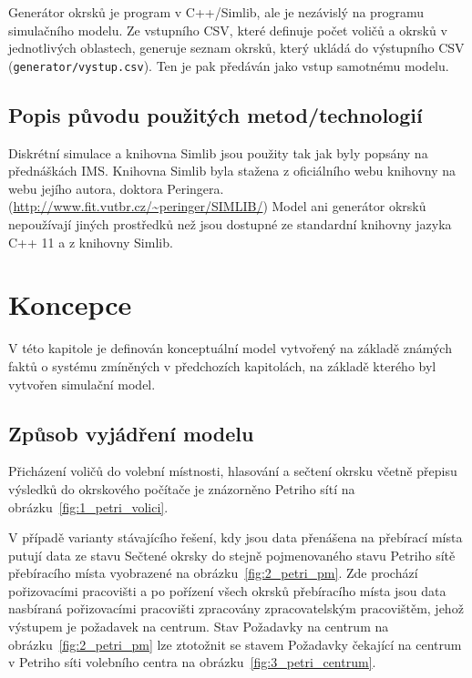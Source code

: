 \documentclass[12pt,a4paper,titlepage,final]{article}
\begin{document}
Generátor okrsků je program v C++/Simlib, ale je nezávislý na programu simulačního modelu. Ze vstupního CSV, které definuje počet voličů a okrsků v jednotlivých oblastech, generuje seznam okrsků, který ukládá do výstupního CSV (\texttt{generator/vystup.csv}). Ten je pak předáván jako vstup samotnému modelu.

\subsection{Popis původu použitých metod/technologií}

Diskrétní simulace a knihovna Simlib jsou použity tak jak byly popsány na přednáškách IMS. Knihovna Simlib byla stažena z oficiálního webu knihovny na webu jejího autora, doktora Peringera. (\url{http://www.fit.vutbr.cz/~peringer/SIMLIB/}) Model ani generátor okrsků nepoužívají jiných prostředků než jsou dostupné ze standardní knihovny jazyka C++ 11 a z knihovny Simlib.

\section{Koncepce} \label{koncepce}

V této kapitole je definován konceptuální model \cite[str. 48]{ims} vytvořený na základě známých faktů o systému zmíněných v předchozích kapitolách, na základě kterého byl vytvořen simulační model.

\subsection{Způsob vyjádření modelu}

Přicházení voličů do volební místnosti, hlasování a sečtení okrsku včetně přepisu výsledků do okrskového počítače je znázorněno Petriho sítí na obrázku~\ref{fig:1_petri_volici}.

V případě varianty stávajícího řešení, kdy jsou data přenášena na přebírací místa putují data ze stavu Sečtené okrsky do stejně pojmenovaného stavu Petriho sítě přebíracího místa vyobrazené na obrázku~\ref{fig:2_petri_pm}. Zde prochází pořizovacími pracovišti a po pořízení všech okrsků přebíracího místa jsou data nasbíraná pořizovacími pracovišti zpracovány zpracovatelským pracovištěm, jehož výstupem je požadavek na centrum. Stav Požadavky na centrum na obrázku~\ref{fig:2_petri_pm} lze ztotožnit se stavem Požadavky čekající na centrum v Petriho síti volebního centra na obrázku~\ref{fig:3_petri_centrum}.
\end{document}
